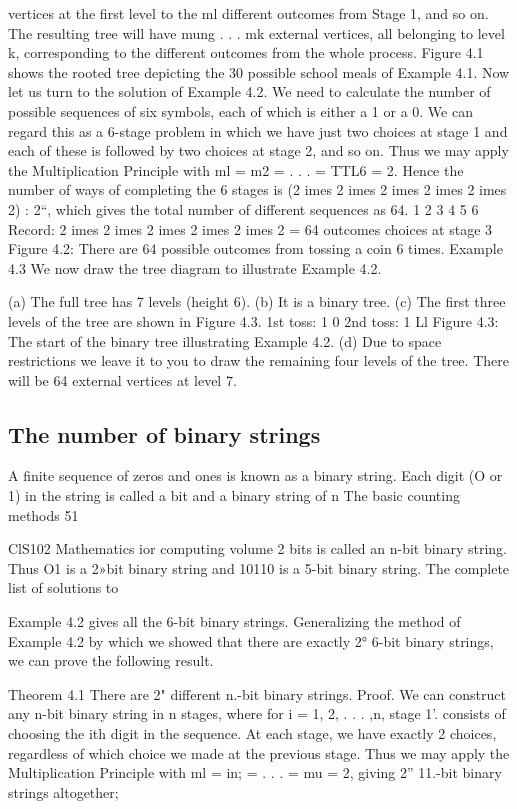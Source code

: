 \documentclass{beamer}
\begin{document}
vertices at the ﬁrst level to the ml different outcomes from Stage 1,
and so on. The resulting tree will have mung . . . mk external
vertices, all belonging to level k, corresponding to the different
outcomes from the whole process. Figure 4.1 shows the rooted tree
depicting the 30 possible school meals of Example 4.1.
Now let us turn to the solution of Example 4.2. We need to calculate
the number of possible sequences of six symbols, each of which is
either a 1 or a 0. We can regard this as a 6-stage problem in which
we have just two choices at stage 1 and each of these is followed by
two choices at stage 2, and so on. Thus we may apply the
Multiplication Principle with ml = m2 = . . . = TTL6 = 2.
Hence the number of ways of completing the 6 stages is
(2 	imes 2 	imes 2 	imes 2 	imes 2 	imes 2) : 2“, which gives the total number of
different sequences as 64.
1 2 3 4 5 6
Record: 2 	imes 2 	imes 2 	imes 2 	imes 2 	imes 2 = 64 outcomes
choices at stage 3
Figure 4.2: There are 64 possible outcomes from tossing a coin 6 times.
Example 4.3 We now draw the tree diagram to illustrate Example 4.2.
\begin{itemize}
(a) The full tree has 7 levels (height 6).
(b) It is a binary tree.
(c) The ﬁrst three levels of the tree are shown in Figure 4.3.
1st toss: 1 0
2nd toss: 1 Ll
Figure 4.3: The start of the binary tree illustrating Example 4.2.
(d) Due to space restrictions we leave it to you to draw the
remaining four levels of the tree. There will be 64 external
vertices at level 7.
\end{itemize}
\subsection{The number of binary strings}
A ﬁnite sequence of zeros and ones is known as a binary string.
Each digit (O or 1) in the string is called a bit and a binary string of n
The basic counting methods
51



ClS102 Mathematics ior computing volume 2
bits is called an n-bit binary string. Thus O1 is a 2»bit binary string
and 10110 is a 5-bit binary string. The complete list of solutions to

Example 4.2 gives all the 6-bit binary strings. Generalizing the
method of Example 4.2 by which we showed that there are exactly
2° 6-bit binary strings, we can prove the following result.

Theorem 4.1 There are 2" different n.-bit binary strings.
Proof. We can construct any n-bit binary string in n stages, where for
i = 1, 2, . . . ,n, stage 1'. consists of choosing the ith digit in the
sequence. At each stage, we have exactly 2 choices, regardless of
which choice we made at the previous stage. Thus we may apply the
Multiplication Principle with ml = in; = . . . = mu = 2, giving 2”
11.-bit binary strings altogether;
\end{document}
